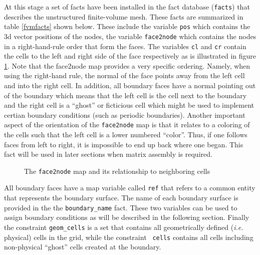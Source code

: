 \documentclass[10pt,epsf]{book}
\begin{document}
At this stage a set of facts have been installed in the fact database
({\tt facts}) that describes the unstructured finite-volume mesh.
These facts are summarized in table \ref{fvmfacts} shown below.  These
include the variable {\tt pos} which contains the 3d vector positions
of the nodes, the variable {\tt face2node} which contains the nodes in
a right-hand-rule order that form the faces.  The variables {\tt cl}
and {\tt cr} contain the cells to the left and right side of the face
respectively as is illustrated in figure \ref{face2node}.  Note that
the face2node map provides a very specific ordering.  Namely, when
using the right-hand rule, the normal of the face points away from the
left cell and into the right cell.  In addition, all boundary faces
have a normal pointing out of the boundary which means that the left
cell is the cell next to the boundary and the right cell is a
``ghost'' or ficticious cell which might be used to implement certian
boundary conditions (such as periodic boundaries).  Another important
aspect of the orientation of the {\tt face2node} map is that it
relates to a coloring of the cells such that the left cell is a lower
numbered ``color''.  Thus, if one follows faces from left to right, it
is impossible to end up back where one began.  This fact will be used
in later sections when matrix assembly is required.

\begin{figure}[htbp]
 \centerline{
  \epsfxsize=3in
  }
 \caption{The {\tt face2node} map and its relationship to neighboring cells}
 \label{face2node}
\end{figure}

All boundary faces have a map variable called {\tt ref} that refers to
a common entity that represents the boundary surface.  The name of
each boundary surface is provided in the the {\tt boundary\_name}
fact.  These two variables can be used to assign boundary conditions
as will be described in the following section.  Finally the constraint
{\tt geom\_cells} is a set that contains all geometrically defined
({\it i.e.} physical) cells in the grid, while the constraint {\tt
  cells} contains all cells including non-physical ``ghost'' cells
created at the boundary.
\end{document}
